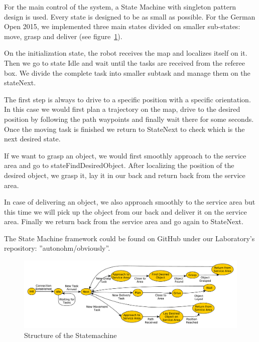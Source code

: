 For the main control of the system, a State Machine with singleton pattern design is used. Every state is designed to be as small as possible. For the German Open 2015, we implemented three main states divided on smaller sub-states: move, grasp and deliver (see figure~\ref{fig:SM}).

On the initialization state, the robot receives the map and localizes itself on it. Then we go to state Idle and wait until the tasks are received from the referee box. We divide the complete task into smaller subtask and manage them on the stateNext. 

The first step is always to drive to a specific position with a specific orientation. In this case we would first plan a trajectory on the map, drive to the desired position by following the path waypoints and finally wait there for some seconds. Once the moving task is finished we return to StateNext to check which is the next desired state.

If we want to grasp an object, we would first smoothly approach to the service area and go to stateFindDesiredObject. After localizing the position of the desired object, we grasp it, lay it in our back and return back from the service area. 

In case of delivering an object, we also approach smoothly to the service area but this time we will pick up the object from our back and deliver it on the service area. Finally we return back from the service area and go again to StateNext.

The State Machine framework could be found on GitHub under our Laboratory’s repository: ”autonohm/obviously”.

\begin{figure}[htbp]
	\centering
	\includegraphics[width=\textwidth]{img/sm}
	\caption{Structure of the Statemachine}
	\label{fig:SM}
\end{figure}